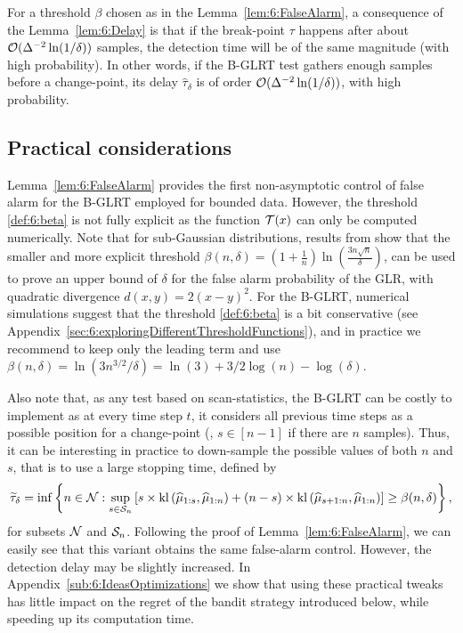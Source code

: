 For a threshold $\beta$ chosen as in the Lemma~\ref{lem:6:FalseAlarm}, a consequence of the Lemma~\ref{lem:6:Delay} is that if the break-point $\tau$ happens after about $\mathcal{O}(\Delta^{-2} \ln(1/\delta))$ samples, the detection time will be of the same magnitude (with high probability).
%
In other words, if the B-GLRT test gathers enough samples before a change-point,
its delay $\widehat{\tau}_\delta$ is of order $\mathcal{O}(\Delta^{-2} \ln(1/\delta))$, with high probability.


\subsection{Practical considerations}\label{sub:6:PracticalConsiderations}

Lemma~\ref{lem:6:FalseAlarm} provides the first non-asymptotic control of false alarm for the B-GLRT employed for bounded data. However, the threshold \eqref{def:6:beta} is not fully explicit as the function $\mathcal{T}(x)$ can only be computed numerically.
Note that for sub-Gaussian distributions, results from \cite{Maillard2018GLR} show that the smaller and more explicit threshold
$\beta(n,\delta) = \left(1 + \frac{1}{n}\right)\ln\left(\frac{3n\sqrt{n}}{\delta}\right)$,
can be used to prove an upper bound of $\delta$ for the false alarm probability of the GLR, with quadratic divergence $d(x,y)=2(x-y)^2$.
%
For the B-GLRT, numerical simulations suggest that the threshold \eqref{def:6:beta} is a bit conservative (see Appendix~\ref{sec:6:exploringDifferentThresholdFunctions}), and in practice we recommend to keep only the leading term and use $\beta(n,\delta) = \ln(3n^{3/2}/\delta) = \ln(3) + 3/2\log(n) - \log(\delta)$.

Also note that, as any test based on scan-statistics, the B-GLRT can be costly to implement as at every time step $t$, it considers all previous time steps as a possible position for a change-point (\ie, $s\in[n-1]$ if there are $n$ samples).
Thus, it can be interesting in practice to down-sample the possible values of both $n$ and $s$, that is to use a large stopping time, defined by
%
\begin{equation}\label{def:6:GLRTricks}
    \widetilde{\tau}_{\delta} = \inf \left\{ n \in \mathcal{N} : \sup_{s \in \mathcal{S}_n} \left[s \times \mathrm{kl}\left(\widehat{\mu}_{1:s},\widehat{\mu}_{1:n}\right) + (n-s) \times \mathrm{kl}\left(\widehat{\mu}_{s+1:n},\widehat{\mu}_{1:n}\right)\right] \geq \beta(n,\delta)\right\},
\end{equation}
%
for subsets $\mathcal{N}$ and $\mathcal{S}_n$. Following the proof of Lemma~\ref{lem:6:FalseAlarm}, we can easily see that this variant obtains the same false-alarm control.
However, the detection delay may be slightly increased.
In Appendix~\ref{sub:6:IdeasOptimizations} we show that using these practical tweaks
has little impact on the regret of the bandit strategy introduced below, while speeding up its computation time.



